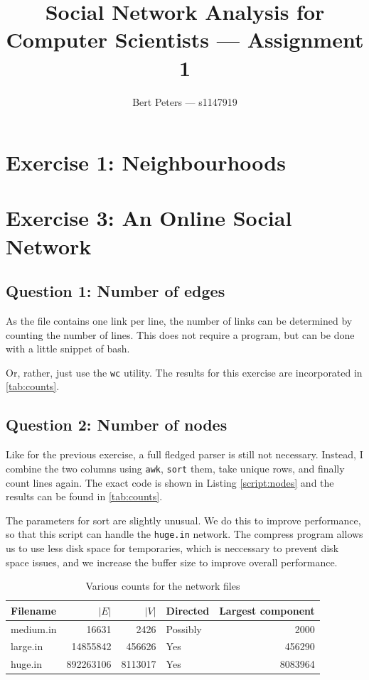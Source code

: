 \documentclass[12pt,a4paper,hidelinks]{article}
\author{Bert Peters --- s1147919}
\title{Social Network Analysis for Computer Scientists --- Assignment 1}
\begin{document}
\maketitle

\section*{Exercise 1: Neighbourhoods}

\section*{Exercise 3: An Online Social Network}

\subsection*{Question 1: Number of edges}

As the file contains one link per line, the number of links can be determined by counting the number of lines. This does not require a program, but can be done with a little snippet of bash.



Or, rather, just use the \texttt{wc} utility. The results for this exercise are incorporated in \autoref{tab:counts}.

\subsection*{Question 2: Number of nodes}

Like for the previous exercise, a full fledged parser is still not necessary. Instead, I combine the two columns using \texttt{awk}, \texttt{sort} them, take unique rows, and finally count lines again. The exact code is shown in Listing \ref{script:nodes} and the results can be found in \autoref{tab:counts}.



The parameters for sort are slightly unusual. We do this to improve performance, so that this script can handle the \texttt{huge.in} network. The compress program allows us to use less disk space for temporaries, which is neccessary to prevent disk space issues, and we increase the buffer size to improve overall performance.

\begin{table}
\centering
\begin{tabular}{l | r | r | l | r}
Filename & {\centering $|E|$} & $|V|$ & Directed & Largest component\\
\hline
medium.in & 16631 & 2426 & Possibly & 2000 \\
large.in & 14855842 & 456626 & Yes & 456290 \\
huge.in & 892263106 & 8113017 & Yes & 8083964
\end{tabular}
\caption{Various counts for the network files}
\label{tab:counts}
\end{table}
\end{document}

